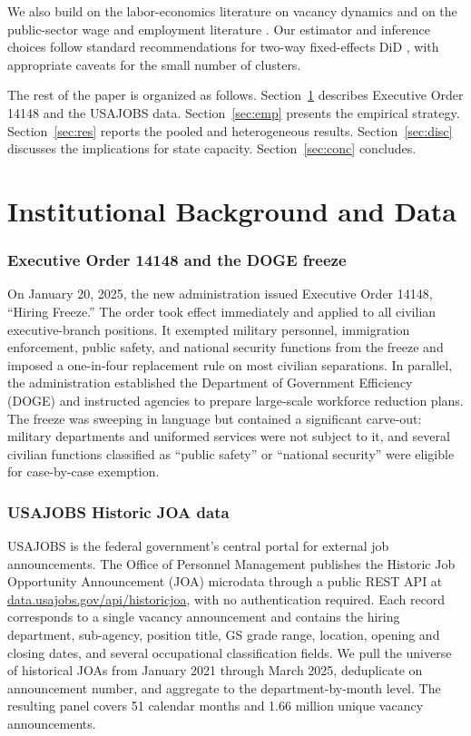 \documentclass[12pt]{article}
\begin{document}
We also build on the labor-economics literature on vacancy dynamics \citep{davis2012labor,davis2013establishment,faberman2012job} and on the public-sector wage and employment literature \citep{krueger1988determinants,borjas2002wage,evans2018federal}. Our estimator and inference choices follow standard recommendations for two-way fixed-effects DiD \citep{callaway2021difference,goodman2021difference}, with appropriate caveats for the small number of clusters.

The rest of the paper is organized as follows. Section~\ref{sec:bg} describes Executive Order 14148 and the USAJOBS data. Section~\ref{sec:emp} presents the empirical strategy. Section~\ref{sec:res} reports the pooled and heterogeneous results. Section~\ref{sec:disc} discusses the implications for state capacity. Section~\ref{sec:conc} concludes.

\section{Institutional Background and Data}
\label{sec:bg}

\subsubsection*{Executive Order 14148 and the DOGE freeze} On January 20, 2025, the new administration issued Executive Order 14148, ``Hiring Freeze.'' The order took effect immediately and applied to all civilian executive-branch positions. It exempted military personnel, immigration enforcement, public safety, and national security functions from the freeze and imposed a one-in-four replacement rule on most civilian separations. In parallel, the administration established the Department of Government Efficiency (DOGE) and instructed agencies to prepare large-scale workforce reduction plans. The freeze was sweeping in language but contained a significant carve-out: military departments and uniformed services were not subject to it, and several civilian functions classified as ``public safety'' or ``national security'' were eligible for case-by-case exemption.

\subsubsection*{USAJOBS Historic JOA data} USAJOBS is the federal government's central portal for external job announcements. The Office of Personnel Management publishes the Historic Job Opportunity Announcement (JOA) microdata through a public REST API at \url{data.usajobs.gov/api/historicjoa}, with no authentication required. Each record corresponds to a single vacancy announcement and contains the hiring department, sub-agency, position title, GS grade range, location, opening and closing dates, and several occupational classification fields. We pull the universe of historical JOAs from January 2021 through March 2025, deduplicate on announcement number, and aggregate to the department-by-month level. The resulting panel covers 51 calendar months and 1.66 million unique vacancy announcements.
\end{document}
